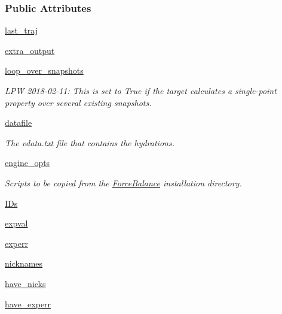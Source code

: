 \subsubsection*{Public Attributes}
\begin{DoxyCompactItemize}
\item 
\hyperlink{classsrc_1_1hydration_1_1Hydration_aa01ef107124d5ceaf4b37b4aa3ce24ea}{last\+\_\+traj}
\item 
\hyperlink{classsrc_1_1hydration_1_1Hydration_a82b277dcc04c151770a4d19c391e5643}{extra\+\_\+output}
\item 
\hyperlink{classsrc_1_1hydration_1_1Hydration_ad83fb8ec772c28e7bd851fa01ebea5e8}{loop\+\_\+over\+\_\+snapshots}
\begin{DoxyCompactList}\small\item\em L\+PW 2018-\/02-\/11\+: This is set to True if the target calculates a single-\/point property over several existing snapshots. \end{DoxyCompactList}\item 
\hyperlink{classsrc_1_1hydration_1_1Hydration_a06f258414131a1e0abd30a2a4152f60d}{datafile}
\begin{DoxyCompactList}\small\item\em The vdata.\+txt file that contains the hydrations. \end{DoxyCompactList}\item 
\hyperlink{classsrc_1_1hydration_1_1Hydration_a89c98ff979b976c89ca6e50390133b17}{engine\+\_\+opts}
\begin{DoxyCompactList}\small\item\em Scripts to be copied from the \hyperlink{namespaceForceBalance}{Force\+Balance} installation directory. \end{DoxyCompactList}\item 
\hyperlink{classsrc_1_1hydration_1_1Hydration_a8053e79c16d43bbfba4f2def46fb8aad}{I\+Ds}
\item 
\hyperlink{classsrc_1_1hydration_1_1Hydration_a92fe873f2e1ee179471186e7d3baf0ca}{expval}
\item 
\hyperlink{classsrc_1_1hydration_1_1Hydration_adceb5d1a7918ff9778ad33de0ce0b6ce}{experr}
\item 
\hyperlink{classsrc_1_1hydration_1_1Hydration_a721881a1e18fc304f04ef00f2611985f}{nicknames}
\item 
\hyperlink{classsrc_1_1hydration_1_1Hydration_a5aebe5836c3b10532e0c9e563aa2c6ef}{have\+\_\+nicks}
\item 
\hyperlink{classsrc_1_1hydration_1_1Hydration_af800dc1689f06da18223710de5cd987c}{have\+\_\+experr}

\end{DoxyCompactItemize}
